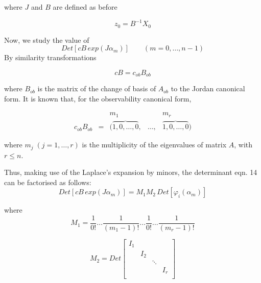 \documentclass{article}
\begin{document}
where $J$ and $B$ are defined as before

\begin{equation}\label{eq:33}
 z_0= B^{-1}X_0
\end{equation}

Now, we study the value of
\begin{equation}\label{eq:34}
 Det[ c B \, exp (J\alpha_{m})] \qquad (m = 0, \ldots , n - 1)
\end{equation}
By similarity transformations

\begin{equation}\label{eq:35}
 cB= c_{ob} B_{ob}
\end{equation}

where $B_{ob}$ is the matrix of
the change of basis of $A_{ob}$ to the Jordan canonical form. It is
known \cite{Kailath} that, for the observability canonical form,

\begin{equation}\label{eq:36}
\begin{array}{ccccc}

  \, & \, & m_1 & \, & m_r \\
  c_{ob} B_{ob} &= & (\overbrace{1,0,\ldots, 0}, & \ldots, & \overbrace{1,0,\ldots, 0})

\end{array}
\end{equation}



where $m_j \;(j=1, \ldots, r)$ is the multiplicity of the eigenvalues of matrix $A$, with $r \leq n$.

Thus, making use of the Laplace's expansion
by minors, the determinant eqn. 14 can be factorised as
follows:
\begin{equation}\label{eq:37}
 Det[ c B \, exp (J\alpha_{m})] =M_1 M_2 \, Det[ \varphi_i(\alpha_{m})]
\end{equation}

where
\begin{equation}\label{eq:38}
M_1= \frac{1}{0!} \ldots \frac{1}{(m_1-1)!} \ldots \frac{1}{0!} \ldots \frac{1}{(m_r-1)!}
\end{equation}


\begin{equation}\label{eq:39}
M_2= Det \left[
           \begin{array}{cccc}
             I_1 & \, & \, & \, \\
             \, & I_2 & \, & \, \\
             \, & \, & \ddots & \, \\
             \, & \, & \, & I_r \\
           \end{array}
         \right]
\end{equation}
\end{document}
